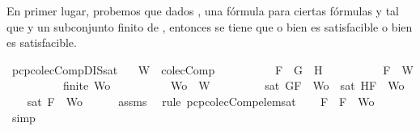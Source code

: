 \begin{isabellebody}
\begin{isamarkuptext}
  En primer lugar, probemos que dados , una fórmula  para ciertas fórmulas  y 
   tal que  y  un subconjunto finito de , entonces se tiene que o bien 
   es satisfacible o bien  es satisfacible.%
\end{isamarkuptext}\isamarkuptrue%
\isamarkupfalse%
\ pcp{\isacharunderscore}colecComp{\isacharunderscore}DIS{\isacharunderscore}sat{}{\isacharcolon}\isanewline
\ \ \ {\isachardoublequoteopen}W\ {\isasymin}\ colecComp{\isachardoublequoteclose}\isanewline
\ \ \ \ \ \ \ \ \ \ {\isachardoublequoteopen}F\ {\isacharequal}\ G\ \isactrlbold {\isasymor}\ H{\isachardoublequoteclose}\isanewline
\ \ \ \ \ \ \ \ \ \ {\isachardoublequoteopen}F\ {\isasymin}\ W{\isachardoublequoteclose}\isanewline
\ \ \ \ \ \ \ \ \ \ {\isachardoublequoteopen}finite\ Wo{\isachardoublequoteclose}\isanewline
\ \ \ \ \ \ \ \ \ \ {\isachardoublequoteopen}Wo\ {\isasymsubseteq}\ W{\isachardoublequoteclose}\isanewline
\ \ \ \ \ \ \ \ \ {\isachardoublequoteopen}sat\ {\isacharparenleft}{\isacharbraceleft}G{\isacharcomma}F{\isacharbraceright}\ {\isasymunion}\ Wo{\isacharparenright}\ {\isasymor}\ sat\ {\isacharparenleft}{\isacharbraceleft}H{\isacharcomma}F{\isacharbraceright}\ {\isasymunion}\ Wo{\isacharparenright}{\isachardoublequoteclose}\isanewline
%
\isadelimproof
%
\endisadelimproof
%
\isatagproof
{}\isamarkupfalse%
\ {\isacharminus}\isanewline
\ \ \isamarkupfalse%
\ {\isachardoublequoteopen}sat\ {\isacharparenleft}{\isacharbraceleft}F{\isacharbraceright}\ {\isasymunion}\ Wo{\isacharparenright}{\isachardoublequoteclose}\isanewline
\ \ \ \ \isamarkupfalse%
\ assms{\isacharparenleft}{}{\isacharcomma}{}{\isacharcomma}{}{\isacharcomma}{}{\isacharparenright}\ \isamarkupfalse%
\ {\isacharparenleft}rule\ pcp{\isacharunderscore}colecComp{\isacharunderscore}elem{\isacharunderscore}sat{\isacharparenright}\isanewline
\ \ \isamarkupfalse%
\ {\isachardoublequoteopen}F\ {\isasymin}\ {\isacharbraceleft}F{\isacharbraceright}\ {\isasymunion}\ Wo{\isachardoublequoteclose}\isanewline
\ \ \ \ \isamarkupfalse%
\ simp\ \isanewline

\end{isabellebody}

